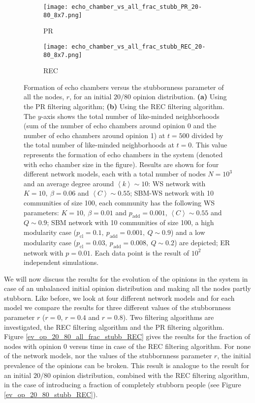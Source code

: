 \documentclass[11 pt , letterpaper , twoside , openright]{book}
\begin{document}
\begin{figure}[H]
  \begin{subfigure}[b]{0.49\textwidth}
  	\texttt{[image: echo\_chamber\_vs\_all\_frac\_stubb\_PR\_20-80\_8x7.png]}
    \caption{PR}
    \label{PR_all_frac_stubb_20-80}
  \end{subfigure}
  \begin{subfigure}[b]{0.49\textwidth}
  	\texttt{[image: echo\_chamber\_vs\_all\_frac\_stubb\_REC\_20-80\_8x7.png]}
    \caption{REC}
    \label{REC_all_frac_stubb_20-80}
  \end{subfigure}
  \captionsetup{format=plain}
  \caption[Formation of echo chambers versus the stubbornness parameter of all the nodes, $r$, for the PR and REC filtering algorithms and an initial $20/80$ opinion distribution.]{Formation of echo chambers versus the stubbornness parameter of all the nodes, $r$, for an initial $20/80$ opinion distribution. \textbf{(a)} Using the PR filtering algorithm; \textbf{(b)} Using the REC filtering algorithm. The $y$-axis shows the total number of like-minded neighborhoods (sum of the number of echo chambers around opinion 0 and the number of echo chambers around opinion 1) at $t=500$ divided by the total number of like-minded neighborhoods at $t=0$. This value represents the formation of echo chambers in the system (denoted with echo chamber size in the figure). Results are shown for four different network models, each with a total number of nodes $N=10^3$ and an average degree around $\left<k\right> \sim 10$: WS network with $K =10,\ \beta = 0.06$ and $\left<C\right> \sim 0.55$; SBM-WS network with 10 communities of size 100, each community has the following WS parameters: $K = 10,\ \beta = 0.01$ and $p_{\text{add}} = 0.001$, $\left<C\right> \sim 0.55$ and $Q \sim 0.9$; SBM network with 10 communities of size 100, a high modularity case ($p_{\text{cl}} = 0.1,\ p_{\text{add}} = 0.001,\ Q \sim 0.9$) and a low modularity case ($p_{\text{cl}} = 0.03,\ p_{\text{add}} = 0.008,\ Q \sim 0.2$) are depicted; ER network with $p= 0.01$. Each data point is the result of $10^2$ independent simulations.}
\label{echo_vs_all_frac_stubb_PR-REC_20-80}
\end{figure}
\noindent
We will now discuss the results for the evolution of the opinions in the system in case of an unbalanced initial opinion distribution and making all the nodes partly stubborn. Like before, we look at four different network models and for each model we compare the results for three different values of the stubbornness parameter $r$ ($r=0$, $r=0.4$ and $r=0.8$). Two filtering algorithms are investigated, the REC filtering algorithm and the PR filtering algorithm.\\
\newline
Figure \ref{ev_op_20_80_all_frac_stubb_REC} gives the results for the fraction of nodes with opinion 0 versus time in case of the REC filtering algorithm. For none of the network models, nor the values of the stubbornness parameter $r$, the initial prevalence of the opinions can be broken. This result is analogue to the result for an initial $20/80$ opinion distribution, combined with the REC filtering algorithm, in the case of introducing a fraction of completely stubborn people (see Figure \ref{ev_op_20_80_stubb_REC}).
\end{document}
